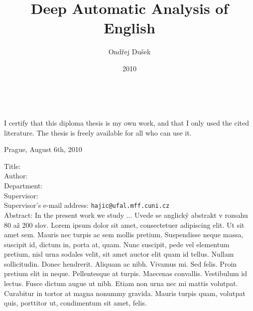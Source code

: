 \documentclass[12pt,notitlepage]{report}
\title{Deep Automatic Analysis of English}
\author{Ondřej Dušek}
\date{2010}
\def\fulldate{August 6th, 2010}
\begin{document}
\maketitle

\pagestyle{plain}
\normalsize %
\setcounter{page}{2} %
\cleardoublepage
\ \vspace{10mm} 

\noindent %
 
\vspace{\fill}
\noindent I certify that this diploma thesis is my own work, and that I only used the cited literature. The thesis is freely available for all who can use it.

 
\bigskip
\noindent Prague, \fulldate \hspace{\fill}\theauthor\\ %


\cleardoublepage
\tableofcontents %

\cleardoublepage %
\pagestyle{plain}
\noindent
Title: \thetitle\\
Author: \theauthor\\
Department: \thedept\\
Supervisor: \thesupervisor\\
Supervisor's e-mail address: \texttt{hajic@ufal.mff.cuni.cz}\\

\noindent Abstract: In the present work we study ... Uvede se anglický abstrakt v rozsahu 80 až 200 slov. Lorem ipsum dolor sit amet, consectetuer adipiscing elit. Ut sit amet sem. Mauris nec turpis ac sem mollis pretium. Suspendisse neque massa, suscipit id, dictum in, porta at, quam. Nunc suscipit, pede vel elementum pretium, nisl urna sodales velit, sit amet auctor elit quam id tellus. Nullam sollicitudin. Donec hendrerit. Aliquam ac nibh. Vivamus mi. Sed felis. Proin pretium elit in neque. Pellentesque at turpis. Maecenas convallis. Vestibulum id lectus. Fusce dictum augue ut nibh. Etiam non urna nec mi mattis volutpat. Curabitur in tortor at magna nonummy gravida. Mauris turpis quam, volutpat quis, porttitor ut, condimentum sit amet, felis. \\
\end{document}
